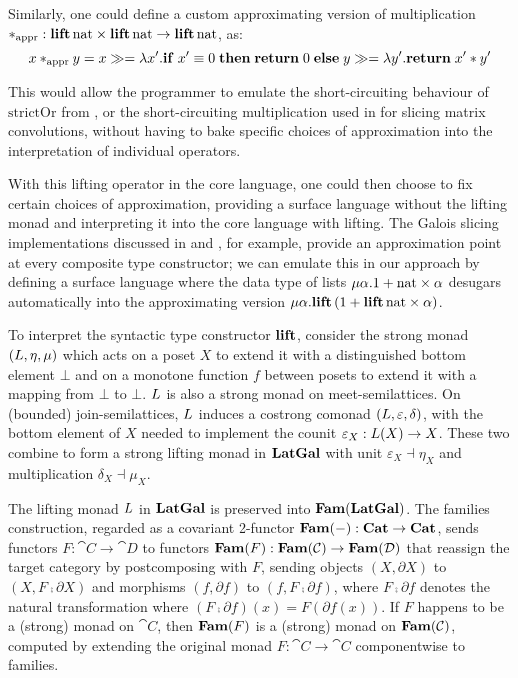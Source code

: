 Similarly, one could define a custom approximating version of multiplication $*_{\text{appr}}:
\mathbf{lift}\,\mathrm{nat} \times \mathbf{lift}\,\mathrm{nat} \to \mathbf{lift}\,\mathrm{nat}$, as:
\[x *_{\text{appr}} y = {x}\gg={\lambda x'.\mathbf{if}\;x' \equiv
0\;\mathbf{then}\;\mathbf{return}\;0\;\mathbf{else}\;{y}\gg={\lambda y'.\mathbf{return}\;x' * y'}}\]

\noindent This would allow the programmer to emulate the short-circuiting behaviour of $\mathrm{strictOr}$
from , or the short-circuiting multiplication used in \citet{perera22} for slicing
matrix convolutions, without having to bake specific choices of approximation into the interpretation of
individual operators.

With this lifting operator in the core language, one could then choose to fix certain choices of
approximation, providing a surface language without the lifting monad and interpreting it into the core
language with lifting. The Galois slicing implementations discussed in \citet{perera12a} and
\citet{ricciotti17}, for example, provide an approximation point at every composite type constructor; we can
emulate this in our approach by defining a surface language where the data type of lists $\mu\alpha.1 +
\mathrm{nat} \times \alpha$ desugars automatically into the approximating version $\mu\alpha.\mathbf{lift}\,(1 +
\mathbf{lift}\,\mathrm{nat} \times \alpha)$.

To interpret the syntactic type constructor $\mathbf{lift}$, consider the strong monad $(L, \eta, \mu)$ which
acts on a poset $X$ to extend it with a distinguished bottom element $\bot$ and on a monotone function $f$
between posets to extend it with a mapping from $\bot$ to $\bot$. $L$ is also a strong monad on
meet-semilattices. On (bounded) join-semilattices, $L$ induces a costrong comonad $(L, \varepsilon,
\delta)$, with the bottom element of $X$ needed to implement the counit $\varepsilon_X: L(X) \to X$. These
two combine to form a strong lifting monad in $\mathbf{LatGal}$ with unit $\varepsilon_X \dashv \eta_X$ and
multiplication $\delta_X \dashv \mu_X$.

The lifting monad $L$ in $\mathbf{LatGal}$ is preserved into $\mathbf{Fam}(\mathbf{LatGal})$. The families construction, regarded
as a covariant 2-functor $\mathbf{Fam}(-): \mathbf{Cat} \to \mathbf{Cat}$, sends functors $F: \cat{C} \to \cat{D}$ to functors
$\mathbf{Fam}(F): \mathbf{Fam}(\mathcal{C}) \to \mathbf{Fam}(\mathcal{D})$ that reassign the target category by postcomposing with $F$,
sending objects $(X, \partial X)$ to $(X, F \comp \partial X)$ and morphisms $(f, \partial f)$ to $(f, F \comp
\partial f)$, where $F \comp \partial f$ denotes the natural transformation where $(F \comp \partial f)(x) =
F(\partial f(x))$. If $F$ happens to be a (strong) monad on $\cat{C}$, then $\mathbf{Fam}(F)$ is a (strong) monad on
$\mathbf{Fam}(\mathcal{C})$, computed by extending the original monad $F: \cat{C} \to \cat{C}$ componentwise to families.
